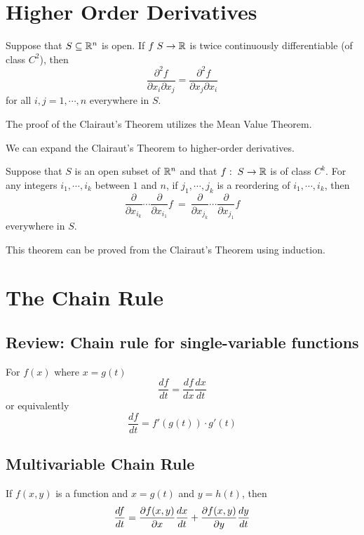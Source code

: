\section{Higher Order Derivatives}

\begin{theorem}
Suppose that $S \subseteq {\mathbb R}^n$ is open. If $f\; S \to {\mathbb R}$ is twice continuously differentiable (of class $C^2$), then
$$
\frac{\partial^2 f}{\partial x_i \partial x_j} = 
\frac{\partial^2 f}{\partial x_j \partial x_i}
$$
for all $i,j=1,\cdots, n$ everywhere in $S$.
\end{theorem}

The proof of the Clairaut's Theorem utilizes the Mean Value Theorem.

We can expand the Clairaut's Theorem to higher-order derivatives.

\begin{theorem}
Suppose that $S$ is an open subset of ${\mathbb R}^n$ and that $f:\;S \to {\mathbb R}$ is of class $C^k$. For any integers $i_1,\cdots,i_k$ between $1$ and $n$, if $j_1,\cdots,j_k$ is a reordering of $i_1,\cdots,i_k$, then
$$
\frac{\partial}{\partial x_{i_k} }\cdots 
\frac{\partial}{\partial x_{i_1} }f
\ = \ 
\frac{\partial}{\partial x_{j_k} }\cdots 
\frac{\partial}{\partial x_{j_1} }f
$$
everywhere in $S$.
\end{theorem}
This theorem can be proved from the Clairaut's Theorem using induction.

\section{The Chain Rule}

\subsection{Review: Chain rule for single-variable functions}
For $f(x)$ where $x=g(t)$
$$
\frac{df}{dt} = \frac{df}{dx}\frac{dx}{dt}
$$
or equivalently
$$
\frac{df}{dt} = f'(g(t)) \cdot g'(t)
$$

\subsection{Multivariable Chain Rule}

\begin{theorem}
If $f(x,y)$ is a function and $x=g(t)$ and $y=h(t)$, then
$$
\frac{df}{dt} = \frac{\partial f(x,y)}{\partial x} \frac{dx}{dt} + \frac{\partial f(x,y)}{\partial y} \frac{dy}{dt}
$$
\end{theorem}


